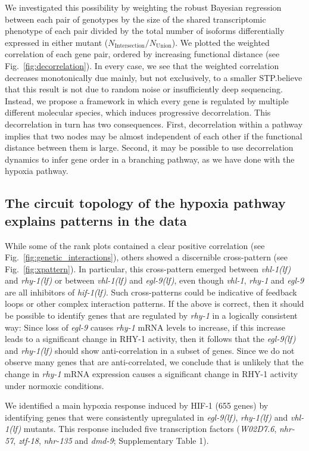 \documentclass[9pt,twocolumn,twoside]{pnas-new}
\newcommand{\gene}[1]{\mbox{\emph{#1}}}
\newcommand{\nhr}{\gene{nhr-57}}
\newcommand{\egl}{\gene{egl-9(lf)}}
\newcommand{\rhy}{\gene{rhy-1(lf)}}
\newcommand{\vhl}{\gene{vhl-1(lf)}}
\newcommand{\hif}{\gene{hif-1(lf)}}
\begin{document}
We investigated this possibility by weighting the robust Bayesian regression
between each pair of genotypes by the size of the shared transcriptomic
phenotype of each pair divided by the total number of isoforms differentially
expressed in either mutant ($N_\mathrm{Intersection}/N_{\mathrm{Union}}$). We
plotted the weighted correlation of each gene pair, ordered by increasing
functional distance (see Fig.~\ref{fig:decorrelation}). In every case, we see
that the weighted correlation decreases monotonically due mainly, but not
exclusively, to a smaller STP.\@We believe that this result is not due to random
noise or insufficiently deep sequencing. Instead, we propose a framework in
which every gene is regulated by multiple different molecular species, which
induces progressive decorrelation. This decorrelation in turn has two
consequences. First, decorrelation within a pathway implies that two nodes may
be almost independent of each other if the functional distance between them is
large. Second, it may be possible to use decorrelation dynamics to infer gene
order in a branching pathway, as we have done with the hypoxia pathway.

\subsection*{The circuit topology of the hypoxia pathway explains patterns in
            the data}
\label{sub:topology}
While some of the rank plots contained a clear positive
correlation (see Fig.~\ref{fig:genetic_interactions}), others showed a
discernible cross-pattern (see Fig.~\ref{fig:xpattern}). In particular, this
cross-pattern emerged between \vhl{} and \rhy{} or between \vhl{} and \egl{},
even though \gene{vhl-1}, \gene{rhy-1} and \gene{egl-9} are all
inhibitors of \hif{}. Such cross-patterns could be indicative of feedback loops
or other complex interaction patterns.
If the above is correct, then it should be possible to identify genes that are
regulated by \gene{rhy-1} in a logically consistent way: Since loss of
\gene{egl-9} causes \gene{rhy-1} mRNA levels to increase, if this increase leads
to a significant change in RHY-1 activity, then it follows that the \egl{} and
\rhy{} should show anti-correlation in a subset of genes.
Since we do not observe many genes that are anti-correlated, we conclude that is
unlikely that the change in \gene{rhy-1} mRNA expression causes a significant
change in RHY-1 activity under normoxic conditions.

We identified a main hypoxia response induced by HIF-1 (655 genes) by
identifying genes that were consistently upregulated in \egl{}, \rhy{} and
\vhl{} mutants. This response included five transcription factors
(\gene{W02D7.6}, \nhr{}, \gene{ztf-18}, \gene{nhr-135} and \gene{dmd-9};
Supplementary Table 1).
\end{document}
